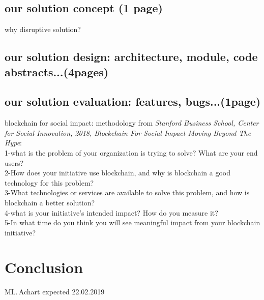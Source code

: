 \documentclass[11pt]{article}
\begin{document}
\subsection{our solution concept (1 page)}
why disruptive solution?
\subsection{our solution design: architecture, module, code abstracts...(4pages)}
\subsection{our solution evaluation: features, bugs...(1page)}
blockchain for social impact: methodology from \textit{Stanford Business School, Center for Social Innovation, 2018, Blockchain For Social Impact Moving Beyond The Hype}:\\
1-what is the problem of your organization is trying to solve? What are your end users?\\
2-How does your initiative use blockchain, and why is blockchain a good technology for this problem?\\
3-What technologies or services are available to solve this problem, and how is blockchain a better solution?\\
4-what is your initiative's intended impact? How do you measure it?\\
5-In what time do you think you will see meaningful impact from your blockchain initiative?\\

\section{Conclusion}
ML.\,Achart expected 22.02.2019
\end{document}
